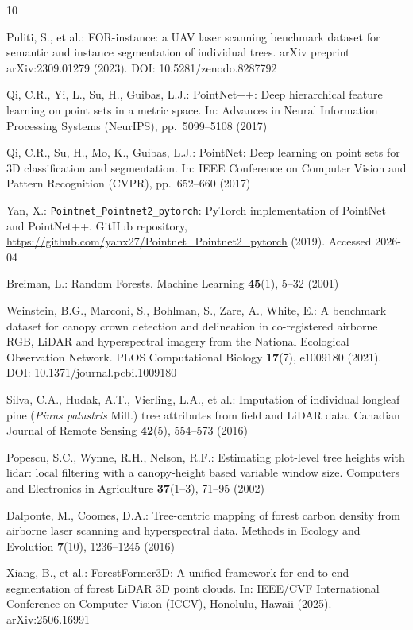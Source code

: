 \documentclass[runningheads]{llncs}
\begin{document}
\begin{thebibliography}{10}

Puliti, S., et al.:
FOR-instance: a UAV laser scanning benchmark dataset for semantic and instance segmentation of individual trees.
arXiv preprint arXiv:2309.01279 (2023).
DOI: 10.5281/zenodo.8287792

Qi, C.R., Yi, L., Su, H., Guibas, L.J.:
PointNet++: Deep hierarchical feature learning on point sets in a metric space.
In: Advances in Neural Information Processing Systems (NeurIPS), pp.~5099--5108 (2017)

Qi, C.R., Su, H., Mo, K., Guibas, L.J.:
PointNet: Deep learning on point sets for 3D classification and segmentation.
In: IEEE Conference on Computer Vision and Pattern Recognition (CVPR), pp.~652--660 (2017)

Yan, X.:
\texttt{Pointnet\_Pointnet2\_pytorch}: PyTorch implementation of PointNet and PointNet++.
GitHub repository, \url{https://github.com/yanx27/Pointnet_Pointnet2_pytorch} (2019). Accessed 2026-04

Breiman, L.:
Random Forests.
Machine Learning \textbf{45}(1), 5--32 (2001)

Weinstein, B.G., Marconi, S., Bohlman, S., Zare, A., White, E.:
A benchmark dataset for canopy crown detection and delineation in co-registered airborne RGB, LiDAR and hyperspectral imagery from the National Ecological Observation Network.
PLOS Computational Biology \textbf{17}(7), e1009180 (2021).
DOI: 10.1371/journal.pcbi.1009180

Silva, C.A., Hudak, A.T., Vierling, L.A., et al.:
Imputation of individual longleaf pine (\emph{Pinus palustris} Mill.) tree attributes from field and LiDAR data.
Canadian Journal of Remote Sensing \textbf{42}(5), 554--573 (2016)

Popescu, S.C., Wynne, R.H., Nelson, R.F.:
Estimating plot-level tree heights with lidar: local filtering with a canopy-height based variable window size.
Computers and Electronics in Agriculture \textbf{37}(1--3), 71--95 (2002)

Dalponte, M., Coomes, D.A.:
Tree-centric mapping of forest carbon density from airborne laser scanning and hyperspectral data.
Methods in Ecology and Evolution \textbf{7}(10), 1236--1245 (2016)

Xiang, B., et al.:
ForestFormer3D: A unified framework for end-to-end segmentation of forest LiDAR 3D point clouds.
In: IEEE/CVF International Conference on Computer Vision (ICCV), Honolulu, Hawaii (2025).
arXiv:2506.16991


\end{thebibliography}
\end{document}
